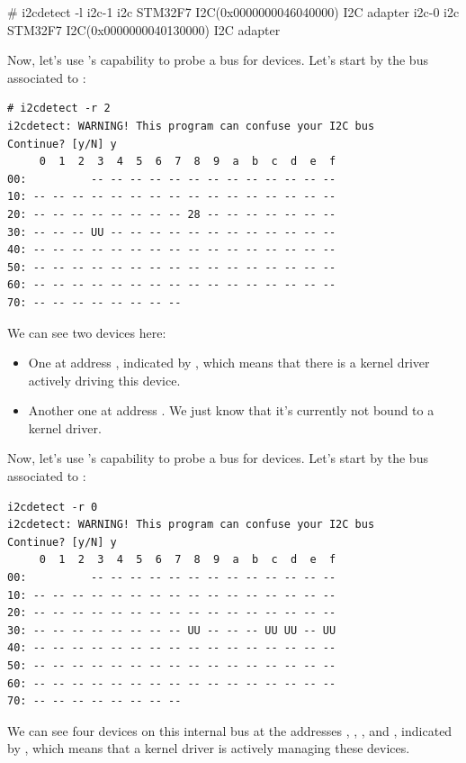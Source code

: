\begin{bashinput}
# i2cdetect -l
i2c-1	i2c       	STM32F7 I2C(0x0000000046040000) 	I2C adapter
i2c-0	i2c       	STM32F7 I2C(0x0000000040130000) 	I2C adapter
\end{bashinput}
\fi

\if{}
Now, let's use 's capability to probe a bus for devices.
Let's start by the bus associated to :

\begin{verbatim}
# i2cdetect -r 2
i2cdetect: WARNING! This program can confuse your I2C bus
Continue? [y/N] y
     0  1  2  3  4  5  6  7  8  9  a  b  c  d  e  f
00:          -- -- -- -- -- -- -- -- -- -- -- -- --
10: -- -- -- -- -- -- -- -- -- -- -- -- -- -- -- --
20: -- -- -- -- -- -- -- -- 28 -- -- -- -- -- -- --
30: -- -- -- UU -- -- -- -- -- -- -- -- -- -- -- --
40: -- -- -- -- -- -- -- -- -- -- -- -- -- -- -- --
50: -- -- -- -- -- -- -- -- -- -- -- -- -- -- -- --
60: -- -- -- -- -- -- -- -- -- -- -- -- -- -- -- --
70: -- -- -- -- -- -- -- --
\end{verbatim}

We can see two devices here:
\begin{itemize}
\item One at address , indicated by , which means
  that there is a kernel driver actively driving this device.
\item Another one at address . We just know that it's
  currently not bound to a kernel driver.
\end{itemize}
\fi
\if{}
Now, let's use 's capability to probe a bus for devices.
Let's start by the bus associated to :

\begin{verbatim}
i2cdetect -r 0
i2cdetect: WARNING! This program can confuse your I2C bus
Continue? [y/N] y
     0  1  2  3  4  5  6  7  8  9  a  b  c  d  e  f
00:          -- -- -- -- -- -- -- -- -- -- -- -- --
10: -- -- -- -- -- -- -- -- -- -- -- -- -- -- -- --
20: -- -- -- -- -- -- -- -- -- -- -- -- -- -- -- --
30: -- -- -- -- -- -- -- -- UU -- -- -- UU UU -- UU
40: -- -- -- -- -- -- -- -- -- -- -- -- -- -- -- --
50: -- -- -- -- -- -- -- -- -- -- -- -- -- -- -- --
60: -- -- -- -- -- -- -- -- -- -- -- -- -- -- -- --
70: -- -- -- -- -- -- -- --
\end{verbatim}

We can see four devices on this internal bus at the addresses
, , , and , indicated by
, which means that a kernel driver is actively managing these
devices.
\fi

